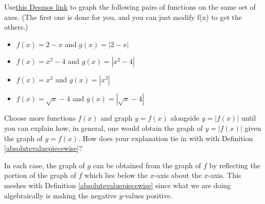 \documentclass{ximera}
\begin{document}
\begin{problem}\label{makeaveewithabsval}
Use\href{https://www.desmos.com/calculator/tzb1yozj6m}{this Desmos link} to graph the following pairs of functions on the same set of axes.  (The first one is done for you, and you can just modify f(x) to get the others.)

\begin{itemize}

\item  $f(x) = 2-x$ and $g(x) = | 2-x |$



\item  $f(x) = x^2-4$ and $g(x) = | x^2 -4 |$

\item  $f(x) = x^3$ and $g(x) = | x^3 |$

\item  $f(x) = \sqrt{x}-4 $ and $g(x) = | \sqrt{x} -4| $

\end{itemize}

Choose more functions $f(x)$ and graph $y = f(x)$ alongside $y = | f(x)|$ until you can explain how, in general, one would obtain the graph of $y = | f(x) |$ given the graph of $y = f(x)$.  How does your explanation tie in with  with Definition \ref{absolutevaluepiecewise}?

\begin{solution}
In each case, the graph of $g$ can be obtained from the graph of $f$ by reflecting the portion of the graph of $f$ which lies below the $x$-axis about the $x$-axis.  This meshes with Definition \ref{absolutevaluepiecewise} since what we are doing algebraically is making the negative $y$-values positive.
\end{solution}
\end{problem}
\end{document}
